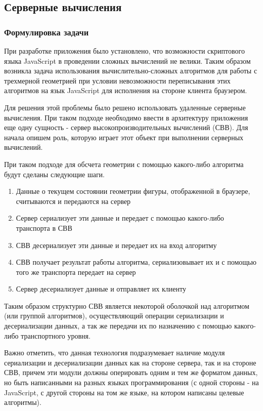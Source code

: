 \documentclass[12pt, a4paper]{article}
\begin{document}
\subsection{Серверные вычисления}
\subsubsection{Формулировка задачи}
При разработке приложения было установлено, что возможности скриптового языка
JavaScript в проведении сложных вычислений не велики. Таким образом возникла
задача использования вычислительно-сложных алгоритмов для работы с трехмерной
геометрией при условии невозможности переписывания этих алгоритмов на язык
JavaScript для исполнения на стороне клиента браузером.

Для решения этой проблемы было решено использовать удаленные серверные
вычисления. При таком подходе необходимо ввести в архитектуру приложения еще
одну сущность - сервер высокопроизводительных вычислений (СВВ). Для начала
опишем роль, которую играет этот объект при выполнении серверных вычислений.

При таком подходе для обсчета геометрии с помощью какого-либо алгоритма будут
сделаны следующие шаги.
\begin{enumerate}
    \item Данные о текущем состоянии геометрии фигуры, отображенной в браузере,
    считываются и передаются на сервер
    \item Сервер сериализует эти данные и передает с помощью какого-либо
    транспорта в СВВ
    \item СВВ десериализует эти данные и передает их на вход алгоритму
    \item СВВ получает результат работы алгоритма, сериализовывает их и с
    помощью того же транспорта передает на сервер
    \item Сервер десериализует данные и отправляет их клиенту
\end{enumerate}

Таким образом структурно СВВ является некоторой оболочкой над алгоритмом (или
группой алгоритмов), осуществляющий операции сериализации и десериализации
данных, а так же передачи их по назначению с помощью какого-либо транспортного
уровня.

Важно отметить, что данная технология подразумевает наличие модуля сериализации
и десериализации данных как на стороне сервера, так и на стороне СВВ, причем
эти модули должны оперировать одним и тем же форматом данных, но быть
написанными на разных языках программирования (с одной стороны - на JavaScript,
с другой стороны на том же языке, на котором написаны целевые алгоритмы).
\end{document}
